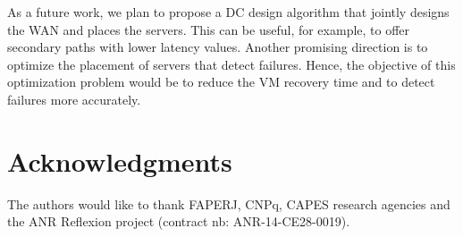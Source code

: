 \documentclass[preprint]{elsarticle}
\begin{document}
As a future work, we plan to propose a DC design algorithm that jointly designs the WAN and places the servers. This can be useful, for example, to offer secondary paths with lower latency values. Another promising direction is to optimize the placement of servers that detect failures. Hence, the objective of this optimization problem would be to reduce the VM recovery time and to detect failures more accurately.

\section*{Acknowledgments}
The authors would like to thank FAPERJ, CNPq, CAPES research agencies and the ANR Reflexion project (contract nb: ANR-14-CE28-0019).






\end{document}
